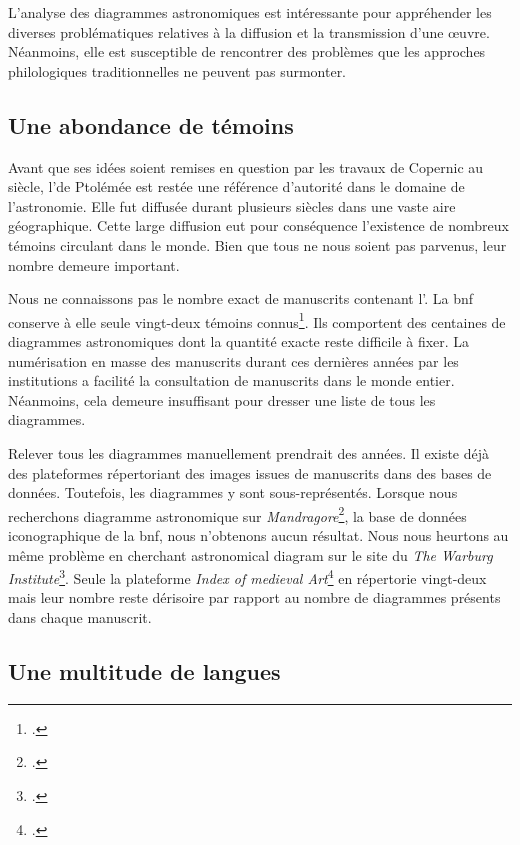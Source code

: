 L'analyse des diagrammes astronomiques est intéressante pour appréhender les diverses problématiques relatives à la diffusion et la transmission d'une œuvre. Néanmoins, elle est susceptible de rencontrer des problèmes que les approches philologiques traditionnelles ne peuvent pas surmonter.


\subsection{Une abondance de témoins}

Avant que ses idées soient remises en question par les travaux de Copernic au \XVI siècle, l'\almageste de Ptolémée est restée une référence d'autorité dans le domaine de l'astronomie. Elle fut diffusée durant plusieurs siècles dans une vaste aire géographique. Cette large diffusion eut pour conséquence l'existence de nombreux témoins circulant dans le monde. Bien que tous ne nous soient pas parvenus, leur nombre demeure important. 

Nous ne connaissons pas le nombre exact de manuscrits contenant l'\almageste. La \gls{bnf} conserve à elle seule vingt-deux témoins connus\footcite{ptolemeeAlmageste}. Ils comportent des centaines de diagrammes astronomiques dont la quantité exacte reste difficile à fixer. La numérisation en masse des manuscrits durant ces dernières années par les institutions a facilité la consultation de manuscrits dans le monde entier. Néanmoins, cela demeure insuffisant pour dresser une liste de tous les diagrammes. 

Relever tous les diagrammes manuellement prendrait des années. Il existe déjà des plateformes répertoriant des images issues de manuscrits dans des bases de données. Toutefois, les diagrammes y sont sous-représentés. Lorsque nous recherchons \og diagramme astronomique \fg sur \textit{Mandragore}\footcite{Mandragore}, la base de données iconographique de la \gls{bnf}, nous n'obtenons aucun résultat. Nous nous heurtons au même problème en cherchant \og astronomical diagram \fg sur le site du \textit{The Warburg Institute}\footcite{WarburgInstituteSchool}. Seule la plateforme \textit{Index of medieval Art}\footcite{princetonuniversityIndexMedievalArt} en répertorie vingt-deux mais leur nombre reste dérisoire par rapport au nombre de diagrammes présents dans chaque manuscrit. 


\subsection{Une multitude de langues}

